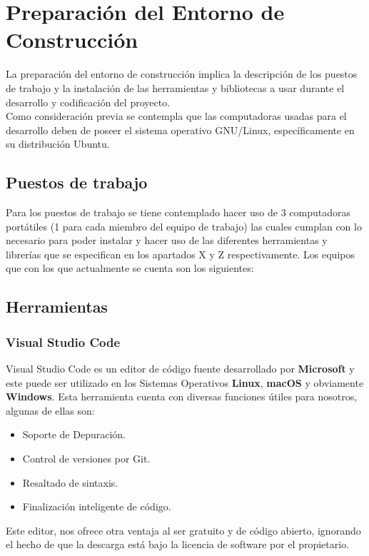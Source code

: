 \section{Preparación del Entorno de Construcción}{
\noindent La preparación del entorno de construcción implica la descripción de los puestos de trabajo y la instalación de las herramientas y bibliotecas a usar durante el desarrollo y codificación del proyecto.\\

\noindent Como consideración previa se contempla que las computadoras usadas para el desarrollo deben de poseer el sistema operativo GNU/Linux, específicamente en su distribución Ubuntu.

\subsection{Puestos de trabajo}{
\noindent Para los puestos de trabajo se tiene contemplado hacer uso de 3 computadoras portátiles (1 para cada miembro del equipo de trabajo) las cuales cumplan con lo necesario para poder instalar y hacer uso de las diferentes herramientas y librerías que se especifican en los apartados X y Z respectivamente. Los equipos que con los que actualmente se cuenta son los siguientes:

}
\subsection{Herramientas}{
\subsubsection{Visual Studio Code}

\noindent Visual Studio Code es un editor de código fuente desarrollado por \textbf{Microsoft} y este puede ser utilizado en los Sistemas Operativos \textbf{Linux}, \textbf{macOS} y obviamente \textbf{Windows}. Esta herramienta cuenta con diversas funciones útiles para nosotros, algunas de ellas son:

\begin{itemize}
    \item Soporte de Depuración.
    \item Control de versiones por Git.
    \item Resaltado de sintaxis.
    \item Finalización inteligente de código.
\end{itemize}
\noindent Este editor, nos ofrece otra ventaja al ser gratuito y de código abierto, ignorando el hecho de que la descarga está bajo la licencia de software por el propietario.\\

}}
